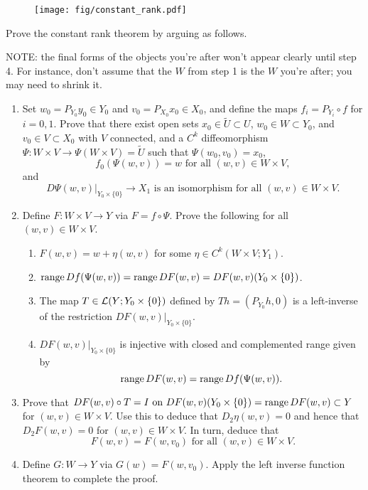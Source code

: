 \documentclass[a4paper]{article}
\begin{document}
\begin{figure}[!ht]
  \centering
  \texttt{[image: fig/constant\_rank.pdf]}
\end{figure}

Prove the constant rank theorem by arguing as follows.

NOTE: the final forms of the objects you're after won't 
appear clearly until step 4. For instance, don't assume 
that the $W$ from step 1 is the $W$ you're after; you 
may need to shrink it.


\begin{enumerate}
\item Set $w_0 = P_{Y_0} y_0 \in Y_0$ and $v_0 = P_{X_0} 
x_0 \in X_0$, and define the maps $f_i = P_{Y_i} \circ f$ 
for $i=0,1$.  Prove that there exist open sets $x_0 \in 
\tilde{U} \subset U$, $w_0  \in W \subset Y_0$, and 
$v_0 \in V \subset X_0$ with $V$ connected, and a $C^k$ 
diffeomorphism $\Psi : W \times V \to \Psi(W\times V) = 
\tilde{U}$ such that $\Psi(w_0, v_0) = x_0$, 
\[ 
f_0(\Psi(w,v)) = w \text{ for all }(w,v) \in W \times V,   
\]
and 
\[ 
D\Psi(w,v) \vert_{Y_0 \times \{0\}} \to X_1 \text{ is an 
isomorphism for all } (w,v) \in W \times V.
\]

\item Define $F : W \times V \to Y$ via $F = f \circ \Psi$. 
Prove the following for all $(w,v) \in W \times V$.
\begin{enumerate}
\item $F(w,v) = w + \eta(w,v)$ for some $\eta \in C^k
(W \times V ; Y_1)$.
\item $\operatorname{range} Df(\Psi(w,v)) = \operatorname{range} DF(w,v) = DF(w,v)(Y_0 
\times \{0\})$.
\item The map  $T \in \mathcal{L}(Y ; Y_0 \times \{0\})$ defined 
by $Th = (P_{Y_0} h, 0)$ is a left-inverse of the restriction 
$DF(w,v) \vert_{Y_0 \times \{0\}}$.
\item $DF(w,v) \vert_{Y_0 \times \{0\}}$ is injective 
with closed and complemented range given by
\[
\operatorname{range} DF(w,v) = \operatorname{range} Df(\Psi(w,v)).
\]
\end{enumerate}

\item Prove that  $DF(w,v) \circ T = I \text{ on } 
DF(w,v)(Y_0 \times \{0\}) = \operatorname{range} DF(w,v) \subset Y$  
for $(w,v) \in W \times V$.  Use this to deduce that 
$D_2 \eta(w,v) =0$ and hence that $D_2 F(w,v) =0$ for 
$(w,v) \in W \times V$.  In turn, deduce that 
\[
F(w,v) = F(w,v_0) \text{ for all }(w,v) \in W \times V.
\]

\item Define $G: W \to Y$ via $G(w) = F(w,v_0)$.  
Apply the left inverse function theorem
to complete the proof.

\end{enumerate}
\end{document}
